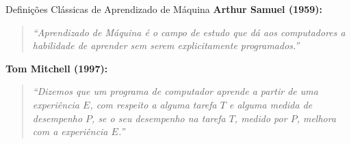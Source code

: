 \documentclass[
  ignorenonframetext,
  aspectratio=169,
]{beamer}
\begin{document}
\begin{frame}{Definições Clássicas de Aprendizado de Máquina}
\label{definiuxe7uxf5es-cluxe1ssicas-de-aprendizado-de-muxe1quina}
\textbf{Arthur Samuel (1959):}

\begin{quote}
\emph{``Aprendizado de Máquina é o campo de estudo que dá aos
computadores a habilidade de aprender sem serem explicitamente
programados.''}
\end{quote}

\pause

\textbf{Tom Mitchell (1997):}

\begin{quote}
\emph{``Dizemos que um programa de computador aprende a partir de uma
experiência \(E\), com respeito a alguma tarefa \(T\) e alguma medida de
desempenho \(P\), se o seu desempenho na tarefa \(T\), medido por \(P\),
melhora com a experiência \(E\).''}
\end{quote}
\end{frame}
\end{document}
